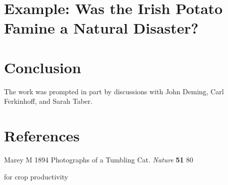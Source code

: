 \documentclass[12pt]{iopart}
\begin{document}
\section{Example: Was the Irish Potato Famine a Natural Disaster?}

\section{Conclusion}


\ack
The work was prompted in part by discussions with John Deming, Carl Ferkinhoff, and Sarah Taber.



\section*{References}
\begin{thebibliography}{99}

Marey M
1894
Photographs of a Tumbling Cat. 
{\it Nature }
{\bf 51} 
80

 for crop productivity


\end{thebibliography}
\end{document}
